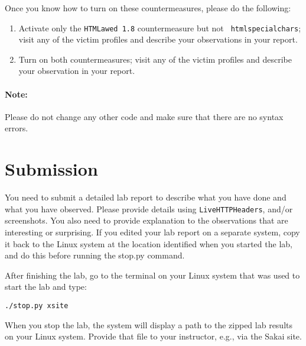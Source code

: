 Once you know how to turn on these countermeasures, please do the
following:
\begin{enumerate}

\item Activate only the {\tt HTMLawed 1.8} countermeasure but not {\tt
htmlspecialchars}; visit any of the victim profiles and describe your
observations in your report. 

\item Turn on both countermeasures; visit any of the victim profiles and 
describe your observation in your report. 



\end{enumerate}


\paragraph{Note:} Please do not change any other code and make sure that there are no syntax
errors.




\section{Submission}
You need to submit a detailed lab report to describe what you have
done and what you have observed. Please provide details using  
{\tt LiveHTTPHeaders},  and/or screenshots.
You also need to provide explanation
to the observations that are interesting or surprising.
If you edited your lab report on a separate system, copy it back to the Linux system at the location
identified when you started the lab, and do this before running the stop.py command.

After finishing the lab, go to the terminal on your Linux system that was used to start the lab and type:	
\begin{verbatim}
./stop.py xsite
\end{verbatim}
When you stop the lab, the system will display a path to the zipped lab results on your Linux system.  Provide that file to 
your instructor, e.g., via the Sakai site.






